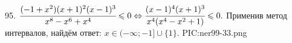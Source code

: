 95. $\cfrac{(-1+x^2)(x+1)^2(x-1)^3}{x^8-x^6+x^4}\leqslant0\Leftrightarrow\cfrac{(x-1)^4(x+1)^3}{x^4(x^4-x^2+1)}\leqslant0.$ Применив метод интервалов, найдём ответ: $x\in(-\infty;-1]\cup\{1\}.$
{{PIC:ner99-33.png}}
\newpage
